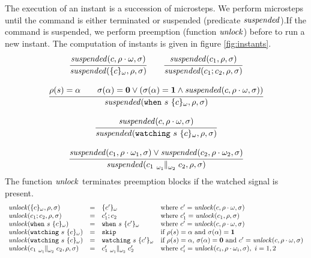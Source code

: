 The execution of an instant is a succession of microsteps. We perform microsteps until
the command is either terminated or suspended (predicate ${\mathit{suspended}}$).If the
command is suspended, we perform preemption (function ${\mathit{unlock}}$) before to run a new instant.
The computation of instants is given in figure \ref{fig:instants}.
$$
  \begin{array}{c}
    \cfrac{
      \suspended(c,\env \cdot \omega,\heap)
    }{
      \suspended(\{c\}_\omega,\env,\heap)
    }
    \qquad
    \cfrac{
      \suspended(c_1,\env,\heap)
    }{
      \suspended(c_1;c_2,\env,\heap)
    }
    \\\\
    \cfrac{
      \env(s)=\alpha \qquad
      \heap(\alpha)=\absent \vee (\heap(\alpha)=\present \wedge
        {\mathit{suspended}}(c,\env \cdot \omega,\heap))
    }
    {{\mathit{suspended}}(\when{s}{\{c\}_\omega},\env,\heap)}
    \\\\
    \cfrac{
      \suspended(c,\env\cdot \omega,\heap)
    }{
      \suspended(\watching{s}{\{c\}_\omega},\env,\heap)
    }
    \\\\
    \cfrac{
      \suspended(c_1,\env \cdot \omega_1,\heap) \vee
      \suspended(c_2,\env \cdot \omega_2,\heap)
    }{
      \suspended({c_1} \parl{\omega_1}{\omega_2} {c_2}, \env, \heap)
    }
  \end{array}
$$
The function ${\mathit{unlock}}$ terminates preemption blocks if the watched signal is present.
$$
  \begin{array}{lcll}
    \unlock(\{c\}_\omega, \env,\sigma)                      & = & \{c'\}_\omega                      & {\text{where }} c'=\unlock(c,\env\cdot\omega,\heap)                                              \\
    \unlock(c_1;c_2, \env,\sigma)                           & = & c_1';c_2                           & {\text{where }} c_1'=\unlock(c_1,\env,\heap)                                                     \\
    \unlock(\when{s}{\{c\}_\omega})                         & = & \when{s}{\{c'\}_\omega}            & {\text{where }} c'=\unlock(c,\env\cdot\omega,\heap)                                              \\
    \unlock(\watching{s}{\{c\}_\omega})                     & = & \skipp                             & {\text{if $\rho(s)=\alpha$ and $\sigma(\alpha)=\present$}}                                       \\
    \unlock(\watching{s}{\{c\}_\omega})                     & = & \watching{s}{\{c'\}_\omega}        & {\text{if $\rho(s)=\alpha$, $\sigma(\alpha)=\absent$ and $c'=\unlock(c,\env\cdot\omega,\heap)$}} \\
    \unlock(c_1 \parl{\omega_1}{\omega_2} c_2, \env, \heap) & = & c_1'\parl{\omega_1}{\omega_2} c_2' & {\text{where }} c_i' = \unlock(c_i,\env\cdot\omega_i,\heap),~i=1,2
  \end{array}
$$

